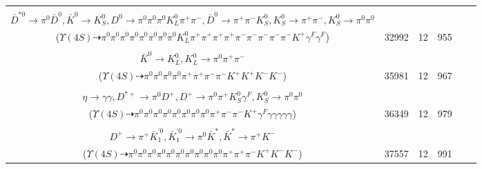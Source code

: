 \documentclass[landscape]{article}
\newcounter{rownumbers}
\newcommand\rn{\stepcounter{rownumbers}\arabic{rownumbers}}
\newcommand{\EOLP}{\\ \hline} %
\newcommand{\topoTags}[1]{#1} %
\begin{document}
\begin{longtable}{clcccc}
\rn & \makecell[l]{ $ 
\Upsilon(4S) \rightarrow B^{0} \bar{B}^{0} ,
B^{0} \rightarrow \pi^{-} K_1^{+} \gamma^{F} ,
\bar{B}^{0} \rightarrow K^{*-} D^{*+} \bar{D}^{*0} ,
K_1^{+} \rightarrow \pi^{0} \pi^{0} K^{+} ,
K^{*-} \rightarrow \pi^{-} \bar{K}^{0} \gamma^{F} ,
D^{*+} \rightarrow \pi^{+} D^{0} ,
$ \\ $
\bar{D}^{*0} \rightarrow \pi^{0} \bar{D}^{0} ,
\bar{K}^{0} \rightarrow K_{S}^{0} ,
D^{0} \rightarrow \pi^{0} \pi^{0} \pi^{0} K_{L}^{0} \pi^{+} \pi^{-} ,
\bar{D}^{0} \rightarrow \pi^{+} \pi^{-} K_{S}^{0} ,
K_{S}^{0} \rightarrow \pi^{+} \pi^{-} ,
K_{S}^{0} \rightarrow \pi^{0} \pi^{0} 
$ \\ ($
\Upsilon(4S) \dashrightarrow \pi^{0} \pi^{0} \pi^{0} \pi^{0} \pi^{0} \pi^{0} \pi^{0} \pi^{0} K_{L}^{0} \pi^{+} \pi^{+} \pi^{+} \pi^{+} \pi^{-} \pi^{-} \pi^{-} \pi^{-} \pi^{-} K^{+} \gamma^{F} \gamma^{F} 
$) } & \topoTags{32992 & }12 & 955 \EOLP

\rn & \makecell[l]{ $ 
\Upsilon(4S) \rightarrow B^{0} \bar{B}^{0} ,
B^{0} \rightarrow \pi^{-} K_{0}^{*+} ,
\bar{B}^{0} \rightarrow \pi^{0} \bar{K}^{*} K^{+} K^{-} D^{0} ,
K_{0}^{*+} \rightarrow \pi^{0} K^{+} ,
\bar{K}^{*} \rightarrow \pi^{0} \bar{K}^{0} ,
D^{0} \rightarrow \pi^{+} K^{-} ,
$ \\ $
\bar{K}^{0} \rightarrow K_{L}^{0} ,
K_{L}^{0} \rightarrow \pi^{0} \pi^{+} \pi^{-} 
$ \\ ($
\Upsilon(4S) \dashrightarrow \pi^{0} \pi^{0} \pi^{0} \pi^{0} \pi^{+} \pi^{+} \pi^{-} \pi^{-} K^{+} K^{+} K^{-} K^{-} 
$) } & \topoTags{35981 & }12 & 967 \EOLP

\rn & \makecell[l]{ $ 
\Upsilon(4S) \rightarrow B^{0} \bar{B}^{0} ,
B^{0} \rightarrow \rho^{-} K_{0}^{*+} \gamma ,
\bar{B}^{0} \rightarrow \pi^{0} \pi^{0} \pi^{-} \eta \eta D^{*+} ,
\rho^{-} \rightarrow \pi^{0} \pi^{-} ,
K_{0}^{*+} \rightarrow \pi^{0} K^{+} ,
\eta \rightarrow \gamma \gamma ,
$ \\ $
\eta \rightarrow \gamma \gamma ,
D^{*+} \rightarrow \pi^{0} D^{+} ,
D^{+} \rightarrow \pi^{0} \pi^{+} K_{S}^{0} \gamma^{F} ,
K_{S}^{0} \rightarrow \pi^{0} \pi^{0} 
$ \\ ($
\Upsilon(4S) \dashrightarrow \pi^{0} \pi^{0} \pi^{0} \pi^{0} \pi^{0} \pi^{0} \pi^{0} \pi^{0} \pi^{+} \pi^{-} \pi^{-} K^{+} \gamma^{F} \gamma \gamma \gamma \gamma \gamma 
$) } & \topoTags{36349 & }12 & 979 \EOLP

\rn & \makecell[l]{ $ 
\Upsilon(4S) \rightarrow B^{0} \bar{B}^{0} ,
B^{0} \rightarrow \pi^{0} K^{+} K^{-} ,
\bar{B}^{0} \rightarrow \pi^{0} \pi^{-} \eta \eta D^{*+} ,
\eta \rightarrow \pi^{0} \pi^{0} \pi^{0} ,
\eta \rightarrow \pi^{0} \pi^{0} \pi^{0} ,
D^{*+} \rightarrow \pi^{0} D^{+} ,
$ \\ $
D^{+} \rightarrow \pi^{+} \bar{K}_1^{\prime0} ,
\bar{K}_1^{\prime0} \rightarrow \pi^{0} \bar{K}^{*} ,
\bar{K}^{*} \rightarrow \pi^{+} K^{-} 
$ \\ ($
\Upsilon(4S) \dashrightarrow \pi^{0} \pi^{0} \pi^{0} \pi^{0} \pi^{0} \pi^{0} \pi^{0} \pi^{0} \pi^{0} \pi^{0} \pi^{+} \pi^{+} \pi^{-} K^{+} K^{-} K^{-} 
$) } & \topoTags{37557 & }12 & 991 \EOLP


\end{longtable}
\end{document}
